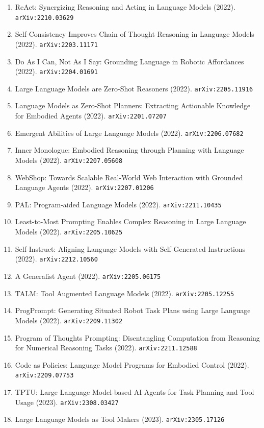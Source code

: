 \documentclass[11pt]{article}
\begin{document}
\begin{enumerate}
  \item ReAct: Synergizing Reasoning and Acting in Language Models (2022). \texttt{arXiv:2210.03629}
  \item Self-Consistency Improves Chain of Thought Reasoning in Language Models (2022). \texttt{arXiv:2203.11171}
  \item Do As I Can, Not As I Say: Grounding Language in Robotic Affordances (2022). \texttt{arXiv:2204.01691}
  \item Large Language Models are Zero-Shot Reasoners (2022). \texttt{arXiv:2205.11916}
  \item Language Models as Zero-Shot Planners: Extracting Actionable Knowledge
  for Embodied Agents (2022). \texttt{arXiv:2201.07207}
  \item Emergent Abilities of Large Language Models (2022). \texttt{arXiv:2206.07682}
  \item Inner Monologue: Embodied Reasoning through Planning with Language
  Models (2022). \texttt{arXiv:2207.05608}
  \item WebShop: Towards Scalable Real-World Web Interaction with Grounded
  Language Agents (2022). \texttt{arXiv:2207.01206}
  \item PAL: Program-aided Language Models (2022). \texttt{arXiv:2211.10435}
  \item Least-to-Most Prompting Enables Complex Reasoning in Large Language
  Models (2022). \texttt{arXiv:2205.10625}
  \item Self-Instruct: Aligning Language Models with Self-Generated Instructions (2022). \texttt{arXiv:2212.10560}
  \item A Generalist Agent (2022). \texttt{arXiv:2205.06175}
  \item TALM: Tool Augmented Language Models (2022). \texttt{arXiv:2205.12255}
  \item ProgPrompt: Generating Situated Robot Task Plans using Large Language
  Models (2022). \texttt{arXiv:2209.11302}
  \item Program of Thoughts Prompting: Disentangling Computation from Reasoning
  for Numerical Reasoning Tasks (2022). \texttt{arXiv:2211.12588}
  \item Code as Policies: Language Model Programs for Embodied Control (2022). \texttt{arXiv:2209.07753}
  \item TPTU: Large Language Model-based AI Agents for Task Planning and Tool Usage (2023). \texttt{arXiv:2308.03427}
  \item Large Language Models as Tool Makers (2023). \texttt{arXiv:2305.17126}

\end{enumerate}
\end{document}
